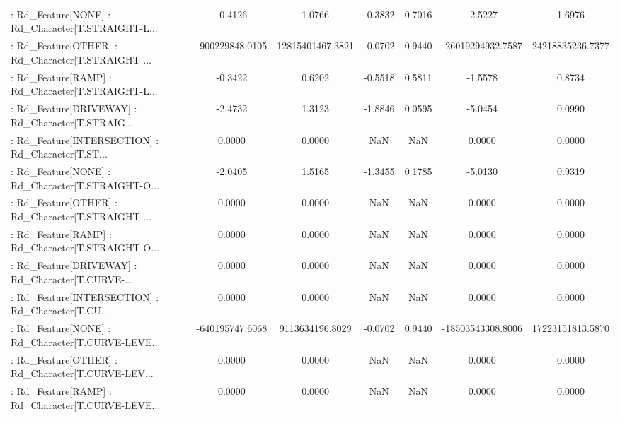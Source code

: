 \begin{longtable}{p{4cm}cccccc}
 : Rd\_Feature[NONE] : Rd\_Character[T.STRAIGHT-L... &           -0.4126 &            1.0766 & -0.3832 &       0.7016 &            -2.5227 &            1.6976 \\
 : Rd\_Feature[OTHER] : Rd\_Character[T.STRAIGHT-... &   -900229848.0105 &  12815401467.3821 & -0.0702 &       0.9440 &  -26019294932.7587 &  24218835236.7377 \\
 : Rd\_Feature[RAMP] : Rd\_Character[T.STRAIGHT-L... &           -0.3422 &            0.6202 & -0.5518 &       0.5811 &            -1.5578 &            0.8734 \\
 : Rd\_Feature[DRIVEWAY] : Rd\_Character[T.STRAIG... &           -2.4732 &            1.3123 & -1.8846 &       0.0595 &            -5.0454 &            0.0990 \\
 : Rd\_Feature[INTERSECTION] : Rd\_Character[T.ST... &            0.0000 &            0.0000 &     NaN &          NaN &             0.0000 &            0.0000 \\
 : Rd\_Feature[NONE] : Rd\_Character[T.STRAIGHT-O... &           -2.0405 &            1.5165 & -1.3455 &       0.1785 &            -5.0130 &            0.9319 \\
 : Rd\_Feature[OTHER] : Rd\_Character[T.STRAIGHT-... &            0.0000 &            0.0000 &     NaN &          NaN &             0.0000 &            0.0000 \\
 : Rd\_Feature[RAMP] : Rd\_Character[T.STRAIGHT-O... &            0.0000 &            0.0000 &     NaN &          NaN &             0.0000 &            0.0000 \\
 : Rd\_Feature[DRIVEWAY] : Rd\_Character[T.CURVE-... &            0.0000 &            0.0000 &     NaN &          NaN &             0.0000 &            0.0000 \\
 : Rd\_Feature[INTERSECTION] : Rd\_Character[T.CU... &            0.0000 &            0.0000 &     NaN &          NaN &             0.0000 &            0.0000 \\
 : Rd\_Feature[NONE] : Rd\_Character[T.CURVE-LEVE... &   -640195747.6068 &   9113634196.8029 & -0.0702 &       0.9440 &  -18503543308.8006 &  17223151813.5870 \\
 : Rd\_Feature[OTHER] : Rd\_Character[T.CURVE-LEV... &            0.0000 &            0.0000 &     NaN &          NaN &             0.0000 &            0.0000 \\
 : Rd\_Feature[RAMP] : Rd\_Character[T.CURVE-LEVE... &            0.0000 &            0.0000 &     NaN &          NaN &             0.0000 &            0.0000 \\

\end{longtable}
